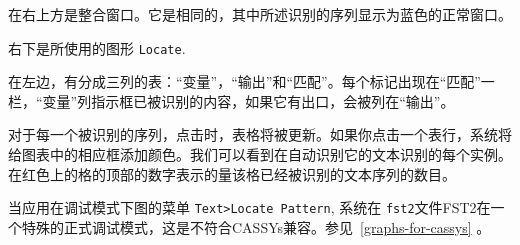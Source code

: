 \medskip 
\indent 在右上方是整合窗口。它是相同的，其中所述识别的序列显示为蓝色的正常窗口。

\medskip
\indent 右下是所使用的图形 \verb+Locate+.

\medskip
\indent 在左边，有分成三列的表：“变量”，“输出”和“匹配”。每个标记出现在“匹配”一栏，“变量”列指示框已被识别的内容，如果它有出口，会被列在“输出”。

\bigskip
\noindent 对于每一个被识别的序列，点击时，表格将被更新。如果你点击一个表行，系统将给图表中的相应框添加颜色。我们可以看到在自动识别它的文本识别的每个实例。在红色上的格的顶部的数字表示的量该格已经被识别的文本序列的数目。

\bigskip
\noindent 当应用在调试模式下图的菜单 \verb+Text>Locate Pattern+,
系统在 \verb+fst2+文件FST2在一个特殊的正式调试模式，这是不符合CASSYs兼容。参见~\ref{graphs-for-cassys} 。
